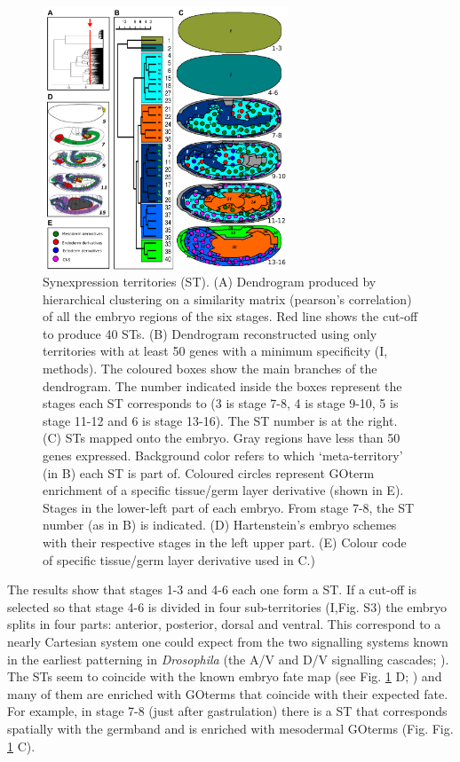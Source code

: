 \begin{figure}[ht]
  \includegraphics[width=0.65\textwidth]{./Images/Art-I/territories.png}
  \centering
  \caption{Synexpression territories (ST). (A) Dendrogram produced by hierarchical clustering on a similarity matrix (pearson's correlation) of all the embryo regions of the six stages. Red line shows the cut-off to produce 40 STs. (B) Dendrogram reconstructed using only territories with at least 50 genes with a minimum specificity (I, methods). The coloured boxes show the main branches of the dendrogram. The number indicated inside the boxes represent the stages each ST corresponds to (3 is stage 7-8, 4 is stage 9-10, 5 is stage 11-12 and 6 is stage 13-16). The ST number is at the right. (C) STs mapped onto the embryo. Gray regions have less than 50 genes expressed. Background color refers to which `meta-territory' (in B) each ST is part of. Coloured circles represent GOterm enrichment of a specific tissue/germ layer derivative (shown in E). Stages in the lower-left part of each embryo. From stage 7-8, the ST number (as in B) is indicated. (D) Hartenstein's embryo schemes \citep{Hartenstein1993} with their respective stages in the left upper part. (E) Colour code of specific tissue/germ layer derivative used in C.)}
  \label{fig:Art-I-territories}
\end{figure}

The results show that stages 1-3 and 4-6 each one form a ST. If a cut-off is selected so that stage 4-6 is divided in four sub-territories (I,Fig. S3) the embryo splits in four parts: anterior, posterior, dorsal and ventral.
This correspond to a nearly Cartesian system one could expect from the two signalling systems known in the earliest patterning in \textit{Drosophila} (the A/V and D/V signalling cascades; \citep{Gilbert2014}).
%
The STs seem to coincide with the known embryo fate map (see Fig. \ref{fig:Art-I-territories} D; \citealp{Hartenstein1993}) and many of them are enriched with GOterms that coincide with their expected fate.
For example, in stage 7-8 (just after gastrulation) there is a ST that corresponds spatially with the germband and is enriched with mesodermal GOterms (Fig. Fig. \ref{fig:Art-I-territories} C).

